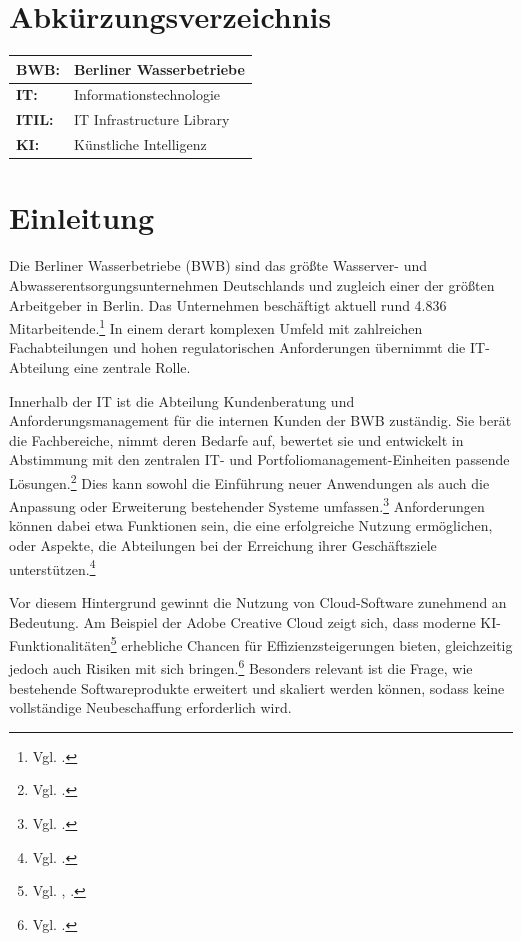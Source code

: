 \documentclass[
    12pt, 
    a4paper,
    ]{scrartcl} %
\begin{document}
\newpage
\section*{Abkürzungsverzeichnis}  
\vspace{0.6cm}
\begin{tabular}{p{4cm} p{11.35cm}}   
    \textbf{\normalsize BWB:} & \normalsize Berliner Wasserbetriebe \\[0.5cm]
    \hline
    \textbf{\normalsize IT:} & \normalsize Informationstechnologie \\[0.5cm]
    \hline
    \textbf{\normalsize ITIL:} & \normalsize IT Infrastructure Library \\[0.5cm]
    \hline
    \textbf{\normalsize KI:} & \normalsize Künstliche Intelligenz \\[0.5cm] 
\end{tabular}

\newpage
{} %
\setcounter{page}{1}
\section{Einleitung}

Die Berliner Wasserbetriebe (BWB) sind das größte Wasserver- und Abwasserentsorgungsunternehmen Deutschlands und zugleich einer der größten Arbeitgeber in Berlin. Das Unternehmen beschäftigt aktuell rund 4.836 Mitarbeitende.\footnote{Vgl. \cite{S_BWB}.} In einem derart komplexen Umfeld mit zahlreichen Fachabteilungen und hohen regulatorischen Anforderungen übernimmt die IT-Abteilung eine zentrale Rolle.

Innerhalb der IT ist die Abteilung Kundenberatung und Anforderungsmanagement für die internen Kunden der BWB zuständig. Sie berät die Fachbereiche, nimmt deren Bedarfe auf, bewertet sie und entwickelt in Abstimmung mit den zentralen IT- und Portfoliomanagement-Einheiten passende Lösungen.\footnote{Vgl. \cite{S_Asana}.} Dies kann sowohl die Einführung neuer Anwendungen als auch die Anpassung oder Erweiterung bestehender Systeme umfassen.\footnote{Vgl. \cite{S_ISR}.} Anforderungen können dabei etwa Funktionen sein, die eine erfolgreiche Nutzung ermöglichen, oder Aspekte, die Abteilungen bei der Erreichung ihrer Geschäftsziele unterstützen.\footnote{Vgl. \cite{S_ISR}.}

Vor diesem Hintergrund gewinnt die Nutzung von Cloud-Software zunehmend an Bedeutung. Am Beispiel der Adobe Creative Cloud zeigt sich, dass moderne KI-Funktionalitäten\footnote{Vgl. \cite{S_AdobeAI}, \cite{S_AdobeCloud}.} erhebliche Chancen für Effizienzsteigerungen bieten, gleichzeitig jedoch auch Risiken mit sich bringen.\footnote{Vgl. \cite{S_Ambient}.} Besonders relevant ist die Frage, wie bestehende Softwareprodukte erweitert und skaliert werden können, sodass keine vollständige Neubeschaffung erforderlich wird.
\end{document}
